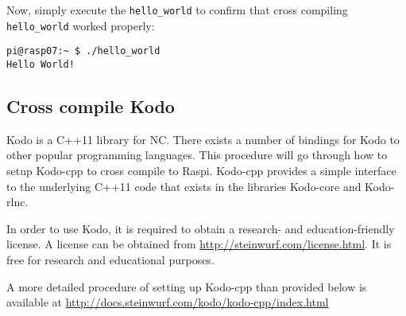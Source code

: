 Now, simply execute the \texttt{hello\_world} to confirm that cross compiling
\texttt{hello\_world} worked properly:

\begin{lstlisting}[]
pi@rasp07:~ $ ./hello_world
Hello World!
\end{lstlisting}
\FloatBarrier
\vspace{-5mm}

\subsection{Cross compile Kodo}

Kodo is a C++11 library for \ac{NC}. There exists a number of bindings for
Kodo to other popular programming languages. This procedure will go through
how to setup Kodo-cpp to cross compile to \ac{Raspi}. Kodo-cpp provides a
simple interface to the underlying C++11 code that exists in the libraries
Kodo-core and Kodo-rlnc.

In order to use Kodo, it is required to obtain a research- and
education-friendly license.
A license can be obtained from \url{http://steinwurf.com/license.html}. It is
free for research and educational purposes.

A more detailed procedure of setting up Kodo-cpp than provided below is available at
\url{http://docs.steinwurf.com/kodo/kodo-cpp/index.html}

